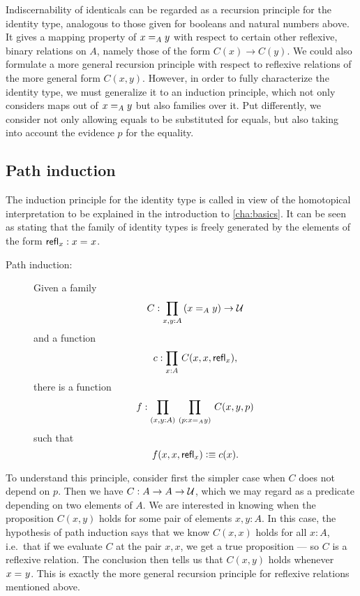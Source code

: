 Indiscernability of identicals can be regarded as a recursion principle for the identity type, analogous to those given for booleans and natural numbers above.  It gives a mapping property of $\id[A] x y$ with respect to certain other reflexive, binary relations on $A$, namely those of the form $C(x) \to C(y)$.  We could also formulate a more general recursion principle with respect to reflexive relations of the more general form $C(x,y)$.  However, 
in order to fully characterize the identity type, we must generalize it to an induction principle, which not only considers maps out of $\id[A] x y$ but also families over it.  Put differently, we consider not only allowing equals to be substituted for equals, but also taking into account the evidence $p$ for the equality.  
    
\subsection{Path induction}

The induction principle for the identity type is called 
%
%
in view of the homotopical interpretation to be explained in  the introduction to \autoref{cha:basics}.  It can be seen as stating that the family of identity types is freely generated by the elements of the form $\refl{x}: \id{x}{x}$.

\begin{description}
\item[Path induction:] 
  Given a family 
  \[ C : \prd{x,y:A} (\id[A]{x}{y}) \to \UU \]
  and a function
  \[ c :  \prd{x:A} C(x,x,\refl{x}),\]
  there is a function
  \[ f : \prd{x,y:A}{p:\id[A]{x}{y}} C(x,y,p) \]
  such that 
  \[ f(x,x,\refl{x}) \defeq c(x). \]
\end{description}

To understand this principle, consider first the simpler case when $C$
does not depend on $p$.  Then we have $C:A\to A\to \UU$, which we may
regard as a predicate depending on two elements of $A$.  We are
interested in knowing when the proposition $C(x,y)$ holds for some pair
of elements $x,y:A$.  In this case, the hypothesis of path induction
says that we know $C(x,x)$ holds for all $x:A$, i.e.\ that if we
evaluate $C$ at the pair $x, x$, we get a true proposition --- so $C$ is
a reflexive relation.  The conclusion then tells us that $C(x,y)$ holds
whenever $\id{x}{y}$.  This is exactly the more general recursion principle
for reflexive relations mentioned above.

